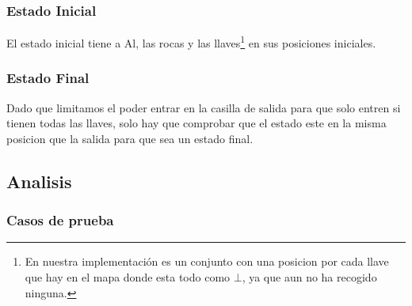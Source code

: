 \documentclass[11pt,spanish]{article}
\begin{document}
		\subsubsection{Estado Inicial}
			El estado inicial tiene a Al, las rocas y las llaves\footnote{En nuestra implementación es un conjunto con una posicion por cada llave que hay en el mapa donde esta todo como $\bot$, ya que aun no ha recogido ninguna.} en sus posiciones iniciales.
		\subsubsection{Estado Final}
			Dado que limitamos el poder entrar en la casilla de salida para que solo entren si tienen todas las llaves, solo hay que comprobar que el estado este en la misma posicion que la salida para que sea un estado final.
	\subsection{Analisis}
		\subsubsection{Casos de prueba}
\end{document}
